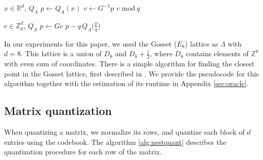\documentclass{article}
\newcommand{\RR}{\mathbb{R}}
\newcommand{\Z}{\mathbb{Z}}
\newcommand{\mmod}[1]{\; \mathrm{mod}\ #1}
\theoremstyle{plain}
\theoremstyle{definition}
\theoremstyle{remark}
\begin{document}
\begin{algorithm}[h]
   \caption{Encode}
   \label{alg:encode}
\begin{algorithmic}
    $x \in \RR^d$, $Q_{\Lambda}$
   \State $p \leftarrow Q_{\Lambda}(x)$
   \State $v \leftarrow G^{-1}p$ 
    {$v \mmod q$} 
\end{algorithmic}
\end{algorithm}




\begin{algorithm}[h]
\caption{Decode}
\label{decode-algo}
\begin{algorithmic}
    $c \in \Z_q^d$, $Q_{\Lambda}$
   \State $p \leftarrow Gc$ 
    $p - q\,Q_{\Lambda}\!\bigl(\tfrac{p}{q}\bigr)$
\end{algorithmic}
\end{algorithm}

In our experiments for this paper, we used the Gosset ($E_8$) lattice as $\Lambda$ with $d = 8$. This lattice is a union of $D_8$ and $D_8 + \frac{1}{2}$, where $D_8$ contains elements of $\Z^8$ with even sum of coordinates. There is a simple algorithm for finding the closest point in the Gosset lattice, first described in \cite{1056484}. We provide the pseudocode for this algorithm together with the estimation of its runtime in Appendix \ref{sec:oracle}.

\subsection{Matrix quantization}

\label{matrix-quant}

When quantizing a matrix, we normalize its rows, and quantize each block of $d$ entries using the codebook. The algorithm \ref{alg:nestquant} describes the quantization procedure for each row of the matrix.
\end{document}
